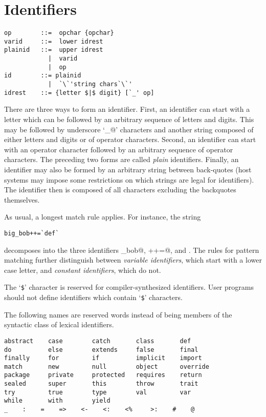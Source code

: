 \section{Identifiers}\label{sec:idents}

\syntax\begin{lstlisting}
op        ::=  opchar {opchar}
varid     ::=  lower idrest
plainid   ::=  upper idrest
            |  varid
            |  op
id        ::= plainid
            |  `\`'string chars`\`'
idrest    ::= {letter $|$ digit} [`_' op]
\end{lstlisting}

There are three ways to form an identifier. First, an identifier can
start with a letter which can be followed by an arbitrary sequence of
letters and digits. This may be followed by underscore `\lstinline@_@'
characters and another string composed of either letters and digits or
of operator characters.  Second, an identifier can start with an operator 
character followed by an arbitrary sequence of operator characters.
The preceding two forms are called {\em plain} identifiers.  Finally,
an identifier may also be formed by an arbitrary string between
back-quotes (host systems may impose some restrictions on which
strings are legal for identifiers).  The identifier then is composed
of all characters excluding the backquotes themselves.
 
As usual, a longest match rule applies. For instance, the string

\begin{lstlisting}
big_bob++=`def`
\end{lstlisting}

decomposes into the three identifiers \lstinline@big_bob@, \lstinline@++=@, and
.  The rules for pattern matching further distinguish between
{\em variable identifiers}, which start with a lower case letter, and
{\em constant identifiers}, which do not.


The `\lstinline[mathescape=false]@$@'\comment{$} character is reserved
for compiler-synthesized identifiers.  User programs should not define
identifiers which contain `\lstinline[mathescape=false]@$@'\comment{$}
characters.

The following names are reserved words instead of being members of the
syntactic class  of lexical identifiers.

\begin{lstlisting}
abstract    case        catch       class       def    
do          else        extends     false       final    
finally     for         if          implicit    import      
match       new         null        object      override    
package     private     protected   requires    return      
sealed      super       this        throw       trait
try         true        type        val         var         
while       with        yield
_    :    =    =>    <-    <:    <%     >:    #    @
\end{lstlisting}


